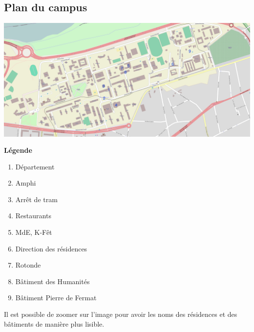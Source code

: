 \subsection{Plan du campus}
\begin{minipage}{0.7\textwidth}
\includegraphics[width=24cm, angle=90]{images/planDoua.jpg}
\end{minipage}
\begin{minipage}{0.3\textwidth}
\textbf{Légende}
    \begin{enumerate}
	\item Département
	\item Amphi
	\item Arrêt de tram
	\item Restaurants
	\item MdE, K-Fêt
	\item Direction des résidences
	\item Rotonde
	\item Bâtiment des Humanités
	\item Bâtiment Pierre de Fermat
    \end{enumerate}
   \vspace{2cm} 
    Il est possible de zoomer sur l'image pour avoir les noms des résidences et
    des bâtiments de manière plus lisible.
\end{minipage}
\newpage

